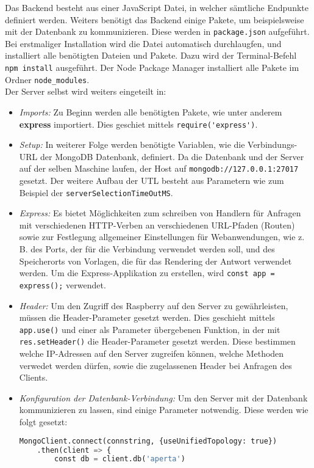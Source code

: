 Das Backend besteht aus einer JavaScript Datei, in welcher sämtliche Endpunkte definiert werden. Weiters benötigt das Backend einige Pakete, um beispielsweise mit der Datenbank zu kommunizieren. Diese werden in \verb|package.json| aufgeführt. Bei erstmaliger Installation wird die Datei automatisch durchlaugfen, und installiert alle benötigten Dateien und Pakete. Dazu wird der Terminal-Befehl \verb|npm install| ausgeführt. Der Node Package Manager installiert alle Pakete im Ordner \verb|node_modules|.\\
Der Server selbst wird weiters eingeteilt in:

\begin{itemize}
    \item \textit{Imports: } Zu Beginn werden alle benötigten Pakete, wie unter anderem \textbf{express} importiert. Dies geschiet mittels \verb|require('express')|.
    \item \textit{Setup:  } In weiterer Folge werden benötigte Variablen, wie die Verbindungs-URL der MongoDB Datenbank, definiert. Da die Datenbank und der Server auf der selben Maschine laufen, der Host auf \verb|mongodb://127.0.0.1:27017| gesetzt. Der weitere Aufbau der UTL besteht aus Parametern wie zum Beispiel der \verb|serverSelectionTimeOutMS|.
    \item \textit{Express: }  Es bietet Möglichkeiten zum schreiben von Handlern für Anfragen mit verschiedenen HTTP-Verben an verschiedenen URL-Pfaden (Routen) sowie zur Festlegung allgemeiner Einstellungen für Webanwendungen, wie z. B. des Ports, der für die Verbindung verwendet werden soll, und des Speicherorts von Vorlagen, die für das Rendering der Antwort verwendet werden. Um die Express-Applikation zu erstellen, wird \verb|const app = express();| verwendet.
    \item \textit{Header: } Um den Zugriff des Raspberry auf den Server zu gewährleisten, müssen die Header-Parameter gesetzt werden. Dies geschieht mittels \verb|app.use()| und einer als Parameter übergebenen Funktion, in der mit \verb|res.setHeader()| die Header-Parameter gesetzt werden. Diese bestimmen welche IP-Adressen auf den Server zugreifen können, welche Methoden verwedet werden dürfen, sowie die zugelassenen Header bei Anfragen des Clients.
    \item \textit{Konfiguration der Datenbank-Verbindung: } Um den Server mit der Datenbank kommunizieren zu lassen, sind einige Parameter notwendig. Diese werden wie folgt gesetzt: \begin{lstlisting}[language=Python, caption=Konfiguration der Datenbankanbindung, label=lst:impl:dbconf]
    MongoClient.connect(connstring, {useUnifiedTopology: true})
    .then(client => {
        const db = client.db('aperta')


\end{lstlisting}
\end{itemize}
